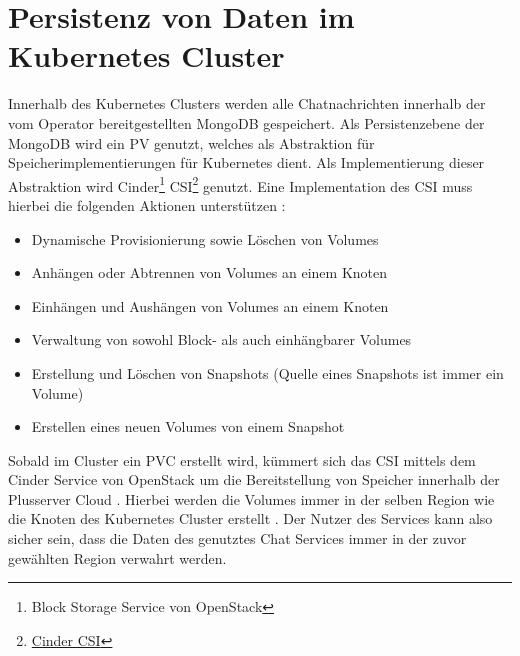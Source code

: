 \section{Persistenz von Daten im Kubernetes Cluster}
\label{subsec:datenschutz:persistenz}
Innerhalb des Kubernetes Clusters werden alle Chatnachrichten innerhalb der vom Operator bereitgestellten MongoDB gespeichert.
Als Persistenzebene der MongoDB wird ein \ac{PV} genutzt,
welches als Abstraktion für Speicherimplementierungen für Kubernetes dient.
Als Implementierung dieser Abstraktion wird 
Cinder\footnote{Block Storage Service von OpenStack} \ac{CSI}\footnote{\href{https://github.com/kubernetes/cloud-provider-openstack/tree/master/pkg/csi/cinder}{Cinder CSI}} genutzt. 
Eine Implementation des \ac{CSI} muss hierbei die folgenden Aktionen unterstützen \cite{container-storage-interface_2021}:
\begin{itemize}
  \item Dynamische Provisionierung sowie Löschen von Volumes
  \item Anhängen oder Abtrennen von Volumes an einem Knoten
  \item Einhängen und Aushängen von Volumes an einem Knoten
  \item Verwaltung von sowohl Block- als auch einhängbarer Volumes
  \item Erstellung und Löschen von Snapshots (Quelle eines Snapshots ist immer ein Volume)
  \item Erstellen eines neuen Volumes von einem Snapshot
\end{itemize}

Sobald im Cluster ein \ac{PVC} erstellt wird, kümmert sich das \ac{CSI} mittels dem Cinder Service von OpenStack 
um die Bereitstellung von Speicher innerhalb der Plusserver Cloud \cite{cinderCSI}.
Hierbei werden die Volumes immer in der selben Region wie die Knoten des Kubernetes Cluster erstellt \cite{kubernetesVolumes}.
Der Nutzer des Services kann also sicher sein, dass die Daten des genutztes Chat Services immer in der zuvor 
gewählten Region verwahrt werden.